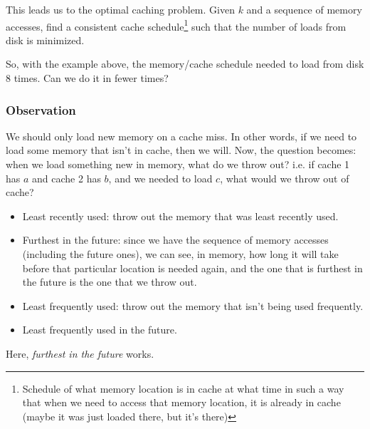 \documentclass[letterpaper]{article}
\begin{document}
\bigskip 

This leads us to the optimal caching problem. Given $k$ and a sequence of memory accesses, find a consistent cache schedule\footnote{Schedule of what memory location is in cache at what time in such a way that when we need to access that memory location, it is already in cache (maybe it was just loaded there, but it's there)} such that the number of loads from disk is minimized. 

\bigskip 

So, with the example above, the memory/cache schedule needed to load from disk 8 times. Can we do it in fewer times? 

\subsubsection{Observation}
We should only load new memory on a cache miss. In other words, if we need to load some memory that isn't in cache, then we will. Now, the question becomes: when we load something new in memory, what do we throw out? i.e. if cache 1 has $a$ and cache 2 has $b$, and we needed to load $c$, what would we throw out of cache?
\begin{itemize}
    \item Least recently used: throw out the memory that was least recently used. 
    \item Furthest in the future: since we have the sequence of memory accesses (including the future ones), we can see, in memory, how long it will take before that particular location is needed again, and the one that is furthest in the future is the one that we throw out. 
    \item Least frequently used: throw out the memory that isn't being used frequently.
    \item Least frequently used in the future.  
\end{itemize}
Here, \emph{furthest in the future} works. 
\end{document}
